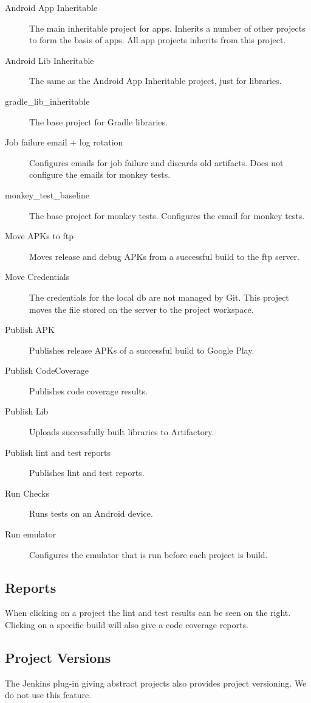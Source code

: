 \begin{description}
  \item[Android App Inheritable] The main inheritable project for apps. Inherits a number of other projects to form the basis of apps. All app projects inherits from this project.
  \item[Android Lib Inheritable] The same as the Android App Inheritable project, just for libraries.
  \item[gradle\_lib\_inheritable] The base project for Gradle libraries.
  \item[Job failure email + log rotation] Configures emails for job failure and discards old artifacts. Does not configure the emails for monkey tests.
  \item[monkey\_test\_baseline] The base project for monkey tests. Configures the email for monkey tests.
  \item[Move APKs to ftp] Moves release and debug APKs from a successful build to the ftp server.
  \item[Move Credentials] The credentials for the local db are not managed by Git. This project moves the file stored on the server to the project workspace.
  \item[Publish APK] Publishes release APKs of a successful build to Google Play.
  \item[Publish CodeCoverage] Publishes code coverage results.
  \item[Publish Lib] Uploads successfully built libraries to Artifactory.
  \item[Publish lint and test reports] Publishes lint and test reports.
  \item[Run Checks] Runs tests on an Android device.
  \item[Run emulator] Configures the emulator that is run before each project is build.
\end{description}

\subsection{Reports}
When clicking on a project the lint and test results can be seen on the right. Clicking on a specific build will also give a code coverage reports.

\subsection{Project Versions}
The Jenkins plug-in giving abstract projects also provides project versioning. We do not use this feature.

